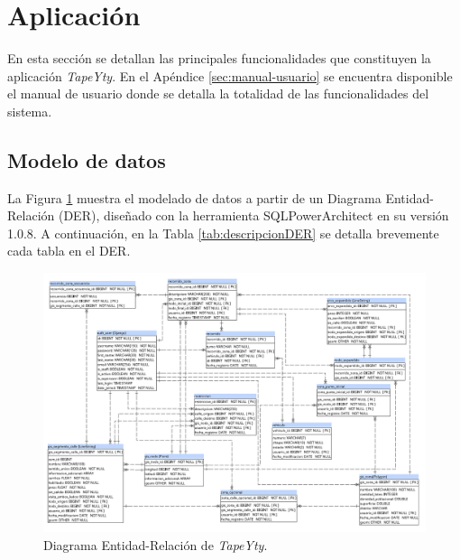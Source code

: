 \section{Aplicación}

En esta sección se detallan las principales funcionalidades que constituyen la aplicación \textit{TapeYty}. En el Apéndice \ref{sec:manual-usuario} se encuentra disponible el manual de usuario donde se detalla la totalidad de las funcionalidades del sistema.

\subsection{Modelo de datos}

La Figura \ref{fig:DERTapeYty} muestra el modelado de datos a partir de un Diagrama Entidad-Relación (DER), diseñado con la herramienta SQLPowerArchitect \citep{SQLArchitect} en su versión 1.0.8. A continuación, en la Tabla \ref{tab:descripcionDER} se detalla brevemente cada tabla en el DER.

\begin{landscape}
\begin{figure}[tbp]
\centerline{\includegraphics[height=\textheight]{20190716_DER.png}}
\caption{Diagrama Entidad-Relación de \textit{TapeYty}.}
\label{fig:DERTapeYty}
\end{figure}
\end{landscape}

